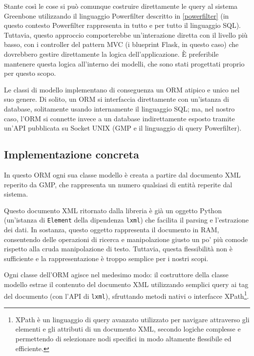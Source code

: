 Stante così le cose si può comunque costruire direttamente le query al sistema Greenbone utilizzando il linguaggio Powerfilter descritto in \ref{powerfilter} (in questo contesto Powerfilter rappresenta in tutto e per tutto il linguaggio SQL). Tuttavia, questo approccio comporterebbe un'interazione diretta con il livello più basso, con i controller del pattern MVC (i blueprint Flask, in questo caso) che dovrebbero gestire direttamente la logica dell'applicazione. È preferibile mantenere questa logica all'interno dei modelli, che sono stati progettati proprio per questo scopo.

Le classi di modello implementano di conseguenza un ORM atipico e unico nel suo genere. Di solito, un ORM si interfaccia direttamente con un'istanza di database, solitamente usando internamente il linguaggio SQL; ma, nel nostro caso, l'ORM si connette invece a un database indirettamente esposto tramite un'API pubblicata su Socket UNIX (GMP e il linguaggio di query Powerfilter).

\subsection{Implementazione concreta}
In questo ORM ogni sua classe modello è creata a partire dal documento XML reperito da GMP, che rappresenta un numero qualsiasi di entità reperite dal sistema.

Questo documento XML ritornato dalla libreria è già un oggetto Python (un'istanza di \texttt{Element} della dipendenza \texttt{lxml}) che facilita il parsing e l'estrazione dei dati. In sostanza, questo oggetto rappresenta il documento in RAM, consentendo delle operazioni di ricerca e manipolazione giusto un po' più comode rispetto alla cruda manipolazione di testo. Tuttavia, questa flessibilità non è sufficiente e la rappresentazione è troppo semplice per i nostri scopi.

Ogni classe dell'ORM agisce nel medesimo modo: il costruttore della classe modello estrae il contenuto del documento XML utilizzando semplici query ai tag del documento (con l'API di \texttt{lxml}), sfruttando metodi nativi o interfacce XPath\footnote{XPath è un linguaggio di query avanzato utilizzato per navigare attraverso gli elementi e gli attributi di un documento XML, secondo logiche complesse e permettendo di selezionare nodi specifici in modo altamente flessibile ed efficiente.}.

